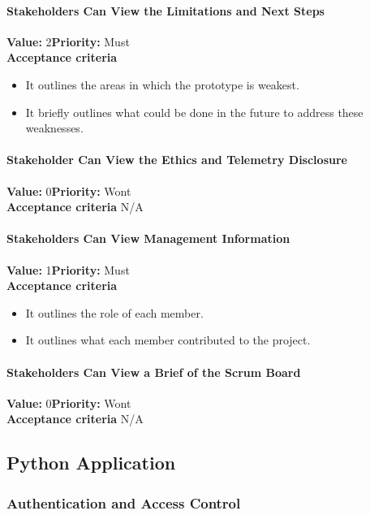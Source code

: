 \paragraph{Stakeholders Can View the Limitations and Next Steps}
\textbf{Value:} 2\quad \textbf{Priority:} Must\\
\textbf{Acceptance criteria}
\begin{itemize}
  \item It outlines the areas in which the prototype is weakest.
  \item It briefly outlines what could be done in the future to address these weaknesses.
\end{itemize}

\paragraph{Stakeholder Can View the Ethics and Telemetry Disclosure}
\textbf{Value:} 0\quad \textbf{Priority:} Wont\\
\textbf{Acceptance criteria} N/A

\paragraph{Stakeholders Can View Management Information}
\textbf{Value:} 1\quad \textbf{Priority:} Must\\
\textbf{Acceptance criteria}
\begin{itemize}
  \item It outlines the role of each member.
  \item It outlines what each member contributed to the project.
\end{itemize}

\paragraph{Stakeholders Can View a Brief of the Scrum Board}
\textbf{Value:} 0\quad \textbf{Priority:} Wont\\
\textbf{Acceptance criteria} N/A

\subsection{Python Application}

\subsubsection{Authentication and Access Control}

